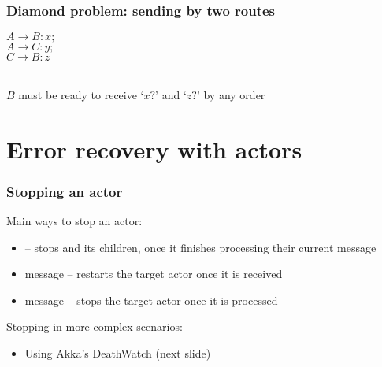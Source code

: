 \documentclass[aspectratio=169]{beamer}
\begin{document}
\begin{frame}[t]\frametitle{Diamond problem: sending by two routes}
    
    $A\to B: x;$\\
    $A\to C: y;$\\
    $C\to B: z$

~\\

$B$ must be ready to receive `$x?$' and `$z?$' by any order

\end{frame}



\section{Error recovery with actors}

\begin{frame}[t]\frametitle{Stopping an actor}
\begin{alertblock}{Main ways to stop an actor:}  
\begin{itemize}
  \item {} -- \alert{stops}  and its children, once it finishes processing their current message
  \item {} message -- \alert{restarts} the target actor once it is received
  \item {} message -- \alert{stops} the target actor  once it is processed
\end{itemize}
\end{alertblock}

\pause

\begin{block}{Stopping in more complex scenarios:}
  \begin{itemize}
    \item Using Akka's \alert{DeathWatch} (next slide)
  \end{itemize}
\end{block}
\end{frame}
\end{document}
